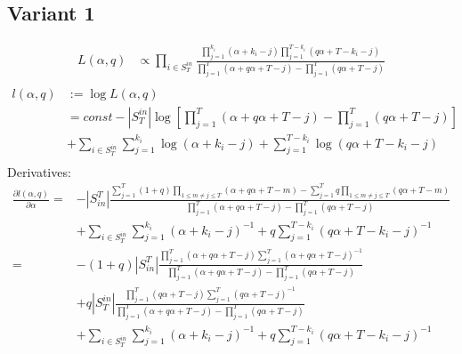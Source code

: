 \documentclass[a4paper, 12pt]{article}
\newcommand{\sint}{|S_{in}^T|}
\begin{document}
\subsection{Variant 1}
\begin{align*}
    L(\alpha, q) &\propto \prod_{i \in S_T^{in}} \frac{\prod_{j=1}^{k_i} (\alpha + k_i - j)\prod_{j=1}^{T - k_i} (q\alpha + T - k_i - j)}{\prod_{j=1}^T(\alpha + q\alpha + T - j) - \prod_{j=1}^T (q\alpha + T - j)} \\
\end{align*}
\begin{align} \label{eq:5}
    l(\alpha, q) &:= \log L(\alpha, q) \nonumber \\
    &= const - |S_T^{in}|\log\left[\prod_{j=1}^T(\alpha + q\alpha + T - j) - \prod_{j=1}^T (q\alpha + T - j)\right] \nonumber \\
    &+ \sum_{i \in S_T^{in}} \sum_{j = 1}^{k_i} \log(\alpha + k_i - j) + \sum_{j = 1}^{T - k_i} \log(q\alpha + T - k_i - j) \nonumber \\
\end{align}
Derivatives:
\begin{align} \label{eq:6}
    \frac{\partial l(\alpha, q)}{\partial \alpha} =& -\sint \frac{\sum_{j = 1}^{T} (1 + q) \prod_{1 \leq m \neq j \leq T} (\alpha + q\alpha + T - m) - \sum_{j = 1}^{T} q \prod_{1 \leq m \neq j \leq T} (q\alpha + T - m)}{\prod_{j = 1}^{T} (\alpha + q\alpha + T - j) - \prod_{j=1}^T (q\alpha + T - j)}\nonumber \\
    &+ \sum_{i \in S_T^{in}} \sum_{j = 1}^{k_i} (\alpha + k_i - j)^{-1} + q\sum_{j = 1}^{T - k_i} (q\alpha + T - k_i - j)^{-1} \nonumber \\
    =& -(1 + q)\sint \frac{ \prod_{j = 1}^{T} (\alpha + q\alpha + T - j) \sum_{j = 1}^{T} (\alpha + q\alpha + T - j)^{-1} }{\prod_{j = 1}^{T} (\alpha + q\alpha + T - j) - \prod_{j=1}^T (q\alpha + T - j)} \nonumber \\
    &+ q|S_T^{in}| \frac{\prod_{j = 1}^{T} (q\alpha + T - j) \sum_{j = 1}^{T} (q\alpha + T - j)^{-1}  }{ \prod_{j = 1}^{T} (\alpha + q\alpha + T - j) - \prod_{j=1}^T (q\alpha + T - j)} \nonumber \\
    &+ \sum_{i \in S_T^{in}} \sum_{j = 1}^{k_i} (\alpha + k_i - j)^{-1} + q\sum_{j = 1}^{T - k_i} (q\alpha + T - k_i - j)^{-1} \nonumber \\
\end{align}
\end{document}
